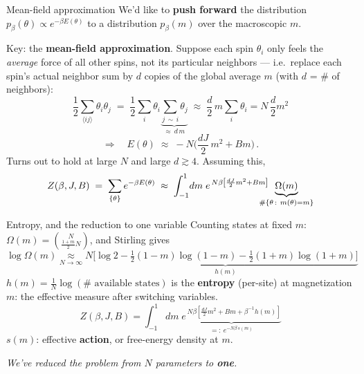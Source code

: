 \documentclass[11pt]{beamer}
\newcommand{\hl}[1]{{\color{blue!60!black}\textbf{#1}}}
\begin{document}
\begin{frame}{Mean-field approximation}
  We'd like to \hl{push forward} the distribution
  $p_\beta(\theta) \propto e^{-\beta E(\theta)}$
  to a distribution $p_\beta(m)$ over the macroscopic $m$. \pause
  \vspace{2mm}

  Key: the \hl{mean-field approximation}. Suppose each spin $\theta_i$
  only feels the \emph{average} force of all other spins, not its
  particular neighbors \pause --- i.e.\ replace each spin's actual neighbor sum
  by $d$ copies of the global average $m$ (with $d$ = \# of neighbors):
  \[
    \frac12 \sum_{\langle ij\rangle} \theta_i\theta_j
    \;=\; \frac12 \sum_i \theta_i
    \underbrace{\sum_{j\,\sim\, i}\theta_j}_{
      \textstyle \approx\ d\, m}
    \;\approx\; \frac{d}{2}\, m \sum_i \theta_i =N\, \frac{d}{2} m^2
  \] \pause
  \[
    \Rightarrow\quad E(\theta) \;\approx\; -N\Big(\frac{dJ}{2}\,m^2 + Bm\Big)\,.
  \] \pause
  Turns out to hold at large $N$ and large $d\gtrsim4$. \pause
  Assuming this,
  \[
    Z(\beta, J, B) \;=\; \sum_{\{\theta\}} e^{-\beta E(\theta)}
    \;\approx\; \int_{-1}^{1}\! dm\;
    e^{\,N\beta\left[\frac{dJ}{2}m^2 + Bm\right]} \hspace{-.4cm}
    \underbrace{\Omega(m)}_{\#\{\theta\,:\ m(\theta) = m\}}
  \]
\end{frame}

\begin{frame}{Entropy, and the reduction to one variable}
  Counting states at fixed $m$: \
  $\Omega(m) = \binom{N}{\frac{1+m}{2}N}$, \pause and Stirling gives
  \[
    \log \Omega(m) \!\! \underset{N\to \infty}{\approx}\!\! N \underbrace{\Big[\log 2 - \tfrac12(1-m)\log(1-m)
    - \tfrac12(1+m)\log(1+m)\Big]}_{\textstyle h(m)}
  \] \pause
  $h(m) = \frac1N \log(\#\text{ available states})$ is the \hl{entropy}
  (per-site) at magnetization $m$: the effective measure after switching variables. \pause
  \[
    Z(\beta, J, B) = \int_{-1}^{1} dm\;
    \underbrace{e^{\,N\beta\left[\frac{dJ}{2}m^2 + Bm + \beta^{-1} h(m)\right]}}_{
      \textstyle =:\ e^{-N\beta\, s(m)}}
  \]
  $s(m)$: effective \hl{action}, or free-energy density at $m$. \pause
  \vspace{2mm}

  \begin{center}
    \emph{We've reduced the problem from $N$ parameters to \hl{one}.}
  \end{center}
\end{frame}
\end{document}

